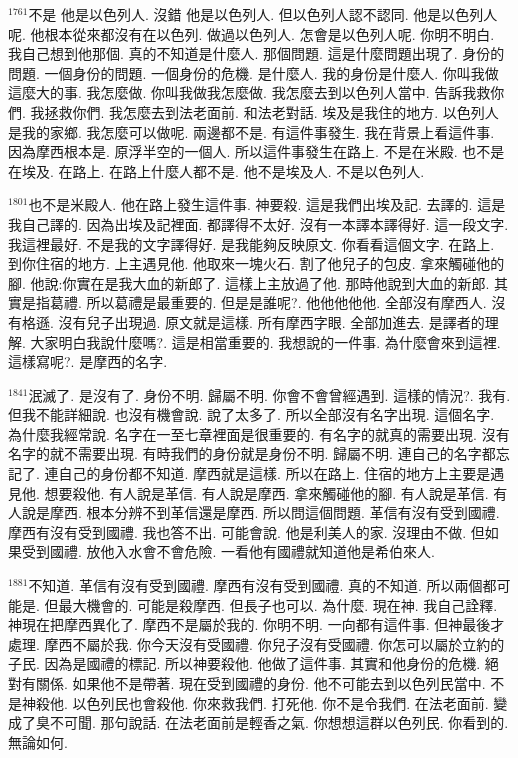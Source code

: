 \documentclass{book}
\begin{document}
$^{1761}$不是 他是以色列人.
沒錯 他是以色列人.
但以色列人認不認同.
他是以色列人呢.
他根本從來都沒有在以色列.
做過以色列人.
怎會是以色列人呢.
你明不明白.
我自己想到他那個.
真的不知道是什麼人.
那個問題.
這是什麼問題出現了.
身份的問題.
一個身份的問題.
一個身份的危機.
是什麼人.
我的身份是什麼人.
你叫我做這麼大的事.
我怎麼做.
你叫我做我怎麼做.
我怎麼去到以色列人當中.
告訴我救你們.
我拯救你們.
我怎麼去到法老面前.
和法老對話.
埃及是我住的地方.
以色列人是我的家鄉.
我怎麼可以做呢.
兩邊都不是.
有這件事發生.
我在背景上看這件事.
因為摩西根本是.
原浮半空的一個人.
所以這件事發生在路上.
不是在米殿.
也不是在埃及.
在路上.
在路上什麼人都不是.
他不是埃及人.
不是以色列人.

$^{1801}$也不是米殿人.
他在路上發生這件事.
神要殺.
這是我們出埃及記.
去譯的.
這是我自己譯的.
因為出埃及記裡面.
都譯得不太好.
沒有一本譯本譯得好.
這一段文字.
我這裡最好.
不是我的文字譯得好.
是我能夠反映原文.
你看看這個文字.
在路上.
到你住宿的地方.
上主遇見他.
他取來一塊火石.
割了他兒子的包皮.
拿來觸碰他的腳.
他說:你實在是我大血的新郎了.
這樣上主放過了他.
那時他說到大血的新郎.
其實是指葛禮.
所以葛禮是最重要的.
但是是誰呢?.
他他他他他.
全部沒有摩西人.
沒有格遜.
沒有兒子出現過.
原文就是這樣.
所有摩西字眼.
全部加進去.
是譯者的理解.
大家明白我說什麼嗎?.
這是相當重要的.
我想說的一件事.
為什麼會來到這裡.
這樣寫呢?.
是摩西的名字.

$^{1841}$泯滅了.
是沒有了.
身份不明.
歸屬不明.
你會不會曾經遇到.
這樣的情況?.
我有.
但我不能詳細說.
也沒有機會說.
說了太多了.
所以全部沒有名字出現.
這個名字.
為什麼我經常說.
名字在一至七章裡面是很重要的.
有名字的就真的需要出現.
沒有名字的就不需要出現.
有時我們的身份就是身份不明.
歸屬不明.
連自己的名字都忘記了.
連自己的身份都不知道.
摩西就是這樣.
所以在路上.
住宿的地方上主要是遇見他.
想要殺他.
有人說是革信.
有人說是摩西.
拿來觸碰他的腳.
有人說是革信.
有人說是摩西.
根本分辨不到革信還是摩西.
所以問這個問題.
革信有沒有受到國禮.
摩西有沒有受到國禮.
我也答不出.
可能會說.
他是利美人的家.
沒理由不做.
但如果受到國禮.
放他入水會不會危險.
一看他有國禮就知道他是希伯來人.

$^{1881}$不知道.
革信有沒有受到國禮.
摩西有沒有受到國禮.
真的不知道.
所以兩個都可能是.
但最大機會的.
可能是殺摩西.
但長子也可以.
為什麼.
現在神.
我自己詮釋.
神現在把摩西異化了.
摩西不是屬於我的.
你明不明.
一向都有這件事.
但神最後才處理.
摩西不屬於我.
你今天沒有受國禮.
你兒子沒有受國禮.
你怎可以屬於立約的子民.
因為是國禮的標記.
所以神要殺他.
他做了這件事.
其實和他身份的危機.
絕對有關係.
如果他不是帶著.
現在受到國禮的身份.
他不可能去到以色列民當中.
不是神殺他.
以色列民也會殺他.
你來救我們.
打死他.
你不是令我們.
在法老面前.
變成了臭不可聞.
那句說話.
在法老面前是輕香之氣.
你想想這群以色列民.
你看到的.
無論如何.
\end{document}
